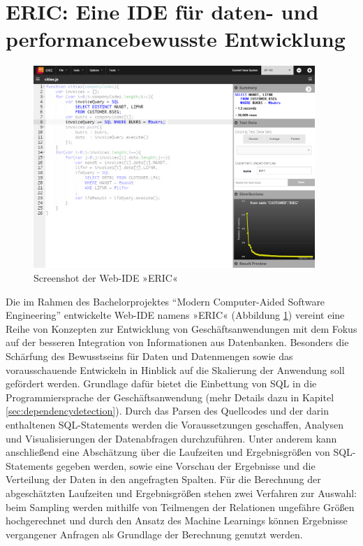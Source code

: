 \clearpage
\section{ERIC: Eine IDE f{\"u}r daten- und performancebewusste Entwicklung}\label{chap:entwicklungsumgebung}

%
%


\begin{figure}[h]
	\centering
  \includegraphics[width=0.95\textwidth]{figures/ide.png}
	\caption{Screenshot der Web-IDE »ERIC«}
	\label{fig:ide}
\end{figure}

Die im Rahmen des Bachelorprojektes ``Modern Computer-Aided Software Engineering'' entwickelte Web-IDE namens »ERIC« (Abbildung \ref{fig:ide}) vereint eine Reihe von Konzepten zur Entwicklung von Geschäftsanwendungen mit dem Fokus auf der besseren Integration von Informationen aus Datenbanken.
Besonders die Schärfung des Bewusstseins für Daten und Datenmengen sowie das vorausschauende Entwickeln in Hinblick auf die Skalierung der Anwendung soll gefördert werden.
Grundlage dafür bietet die Einbettung von SQL in die Programmiersprache der Geschäftsanwendung \cite{Horschig2014} (mehr Details dazu in Kapitel \ref{sec:dependencydetection}).
Durch das Parsen des Quellcodes \cite{Horschig2014} und der darin enthaltenen SQL-Statements \cite{Schulz2014} werden die Voraussetzungen geschaffen, Analysen und Visualisierungen der Datenabfragen durchzuführen.
Unter anderem kann anschließend eine Abschätzung über die Laufzeiten und Ergebnisgrößen von SQL-Statements gegeben werden, sowie eine Vorschau der Ergebnisse und die Verteilung der Daten in den angefragten Spalten.
Für die Berechnung der abgeschätzten Laufzeiten und Ergebnisgrößen stehen zwei Verfahren zur Auswahl: beim Sampling \cite{Exner2014} werden mithilfe von Teilmengen der Relationen ungefähre Größen hochgerechnet und durch den Ansatz des Machine Learnings \cite{Mues2014} können Ergebnisse vergangener Anfragen als Grundlage der Berechnung genutzt werden.

